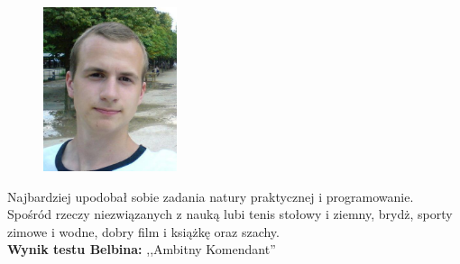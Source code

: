 \begin{figure}[H]
	\centering
	\includegraphics[width=0.35\textwidth]{img/marcin.jpg}
\end{figure}
Najbardziej upodobał sobie zadania natury praktycznej i programowanie. Spośród rzeczy niezwiązanych z nauką lubi tenis stołowy i ziemny, brydż, sporty zimowe i wodne, dobry film i książkę oraz szachy.\\
\textbf{Wynik testu Belbina: },,Ambitny Komendant''
